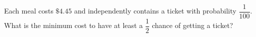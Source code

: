 Each meal costs $\$4.45$ and independently contains a ticket with probability $\dfrac{1}{100}$. What is the minimum cost to have at least a $\dfrac{1}{2}$ chance of getting a ticket?
